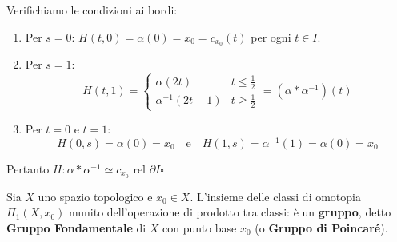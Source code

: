 Verifichiamo le condizioni ai bordi:
\begin{enumerate}[label=\roman*)]
    \item Per $s = 0$: $H(t,0) = \alpha(0) = x_0 = c_{x_0}(t)$ per ogni $t \in I$.
    \item Per $s = 1$:
    \[
    H(t,1) = 
    \begin{cases}
        \alpha(2t) & t \leqslant \frac{1}{2} \\
        \alpha^{-1}(2t-1) & t \geqslant \frac{1}{2}
    \end{cases}
    = (\alpha * \alpha^{-1})(t)
    \]
    \item Per $t = 0$ e $t = 1$:
    \[
    H(0,s) = \alpha(0) = x_0 \quad \text{e} \quad H(1,s) = \alpha^{-1}(1) = \alpha(0) = x_0
    \]
\end{enumerate}
Pertanto $H: \alpha * \alpha^{-1} \simeq c_{x_0} \text{ rel } \partial I$\hfill$\square$

\vspace{2em}

\begin{coro}
Sia $X$ uno spazio topologico e $x_0 \in X$. L'insieme delle classi di omotopia $\Pi_1(X, x_0)$ munito dell'operazione di prodotto tra classi:
è un \textbf{gruppo}, detto \textbf{Gruppo Fondamentale} di $X$ con punto base $x_0$ (o \textbf{Gruppo di Poincaré}).
\end{coro}

